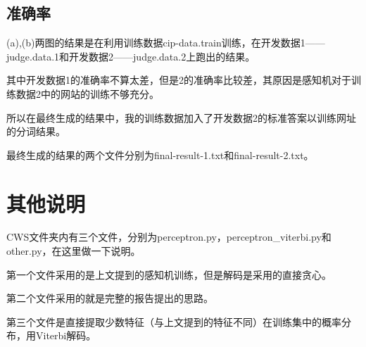 \documentclass[11pt, a4paper]{article}
\begin{document}
\begin{CJK*}{UTF8}{gbsn}
			\subsection{准确率}
				\begin{figure} 
					\centering
				\end{figure}
				(a),(b)两图的结果是在利用训练数据cip-data.train训练，在开发数据1——judge.data.1和开发数据2——judge.data.2上跑出的结果。
				
				其中开发数据1的准确率不算太差，但是2的准确率比较差，其原因是感知机对于训练数据2中的网站的训练不够充分。
				
				所以在最终生成的结果中，我的训练数据加入了开发数据2的标准答案以训练网址的分词结果。
				
				最终生成的结果的两个文件分别为final-result-1.txt和final-result-2.txt。
		\section{其他说明}
		
			CWS文件夹内有三个文件，分别为perceptron.py，perceptron\_viterbi.py和other.py，在这里做一下说明。
			
			第一个文件采用的是上文提到的感知机训练，但是解码是采用的直接贪心。
			
			第二个文件采用的就是完整的报告提出的思路。
			
			第三个文件是直接提取少数特征（与上文提到的特征不同）在训练集中的概率分布，用Viterbi解码。
			
	\newpage			
	\end{CJK*}
\end{document}
